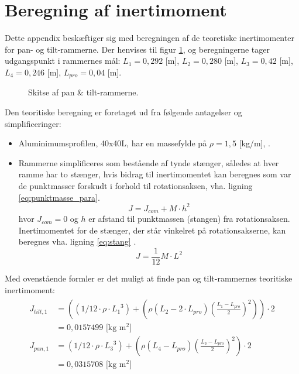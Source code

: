 \section{Beregning af inertimoment}
\label{sec:inertimomentberegning}
Dette appendix beskæftiger sig med beregningen af de teoretiske inertimomenter
for pan- og tilt-rammerne. Der henvises til figur \ref{fig:inerti_PTS}, og
beregningerne tager udgangspunkt i rammernes mål:
\({L_{1}} =0,292\) [m],
\({L_{2}} =0,280\) [m], \({L_{3}}= 0,42\) [m], \({L_{4}} =0,246\) [m], \({L_{pro}}=0,04\) [m].

\begin{figure}[!th]
\centering
\begin{tikzpicture}[scale=0.7]

\end{tikzpicture}
\caption[Skitse af pan \& tilt-rammerne]{Skitse af pan \& tilt-rammerne.}
\label{fig:inerti_PTS}
\end{figure}

Den teoritiske beregning er foretaget ud fra følgende antagelser og simplificeringer:
\begin{itemize}
\item Aluminimumsprofilen, 40x40L, har en massefylde på \(\rho=1,5\) [kg/m], \citep[Kap. 2 Side. 4]{alu_profil_desitet}.
\item Rammerne simplificeres som bestående af tynde stænger, således at hver ramme har to stænger, hvis bidrag
til inertimomentet kan beregnes som var de punktmasser forskudt i forhold til rotationsaksen\citep[Side. 254, ligning 10-36]{fund_of_physics},
vha. ligning \ref{eq:punktmasse_para}.
\begin{equation}
J={ J }_{ com }+M\cdot { h }^{ 2 }
\label{eq:punktmasse_para} 
\end{equation}
hvor \({J_{com}} = 0\) og \(h\) er afstand til punktmassen (stangen) fra rotationsaksen.
Inertimomentet for de stænger, der står vinkelret på rotationsakserne, kan beregnes vha. ligning \ref{eq:stang}
\citep[Side. 255, tabel 10-2e]{fund_of_physics}.
\begin{equation}
J=\frac { 1 }{ 12 } M\cdot { L }^{ 2 }
\label{eq:stang} 
\end{equation}
\end{itemize}

Med ovenstående formler er det muligt at finde pan og tilt-rammernes teoritiske inertimoment:
\begin{align}
\label{eq:inerti_tilt_pan}
\begin{split}
{ J }_{ tilt,1 } &= \left( \left( 1/12\cdot \rho \cdot { {L_{1}} }^{ 3 } \right) +\left( \rho \left( {L_{2}}-2\cdot {L_{pro}} \right) { \left( \frac { {L_{1}}-{L_{pro}}}{ 2 }  \right)  }^{ 2 } \right)  \right) \cdot 2
\\
 &= 0,0157499 \text{ [kg m$^2$]}
\\
{ J }_{ pan,1 }&=\left( 1/12\cdot \rho \cdot { { L }_{ 3 } }^{ 3 } \right) +\left( \rho \left( { L }_{ 4 }-{ L }_{ pro } \right) { \left( \frac { { L }_{ 3 }-{ L }_{ pro } }{ 2 }  \right)  }^{ 2 } \right) \cdot 2
\\
 &=0,0315708 \text{ [kg m$^2$]}
\end{split}
\end{align}

